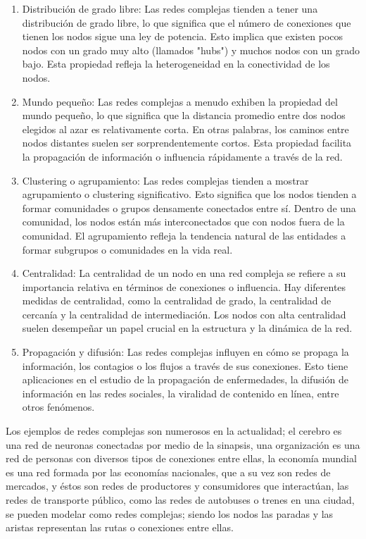 \begin{enumerate}
    \item Distribución de grado libre: Las redes complejas tienden a tener una distribución de grado 
    libre, lo que significa que el número de conexiones que tienen los nodos sigue una ley de potencia. 
    Esto implica que existen pocos nodos con un grado muy alto (llamados "hubs") y muchos nodos con un 
    grado bajo. Esta propiedad refleja la heterogeneidad en la conectividad de los nodos.
    \item Mundo pequeño: Las redes complejas a menudo exhiben la propiedad del mundo pequeño, lo que 
    significa que la distancia promedio entre dos nodos elegidos al azar es relativamente corta. En 
    otras palabras, los caminos entre nodos distantes suelen ser sorprendentemente cortos. Esta propiedad 
    facilita la propagación de información o influencia rápidamente a través de la red.
    \item Clustering o agrupamiento: Las redes complejas tienden a mostrar agrupamiento o clustering significativo.
    Esto significa que los nodos tienden a formar comunidades o grupos densamente conectados entre sí. Dentro 
    de una comunidad, los nodos están más interconectados que con nodos fuera de la comunidad. El agrupamiento 
    refleja la tendencia natural de las entidades a formar subgrupos o comunidades en la vida real.
    \item Centralidad: La centralidad de un nodo en una red compleja se refiere a su importancia relativa 
    en términos de conexiones o influencia. Hay diferentes medidas de centralidad, como la centralidad de 
    grado, la centralidad de cercanía y la centralidad de intermediación. Los nodos con alta centralidad 
    suelen desempeñar un papel crucial en la estructura y la dinámica de la red.
    \item Propagación y difusión: Las redes complejas influyen en cómo se propaga la información, los 
    contagios o los flujos a través de sus conexiones. Esto tiene aplicaciones en el estudio de la propagación 
    de enfermedades, la difusión de información en las redes sociales, la viralidad de contenido en línea, 
    entre otros fenómenos.
\end{enumerate}

Los ejemplos de redes complejas son numerosos en la actualidad; el cerebro es una red de neuronas
conectadas por medio de la sinapsis, una organización es una red de personas con diversos
tipos de conexiones entre ellas, la economía mundial es una red formada por las economías
nacionales, que a su vez son redes de mercados, y éstos son redes de productores y consumidores
que interactúan, las redes de transporte público, como las redes de autobuses o trenes en una ciudad, 
se pueden modelar como redes complejas; siendo los nodos las paradas y las aristas representan las 
rutas o conexiones entre ellas. \\

